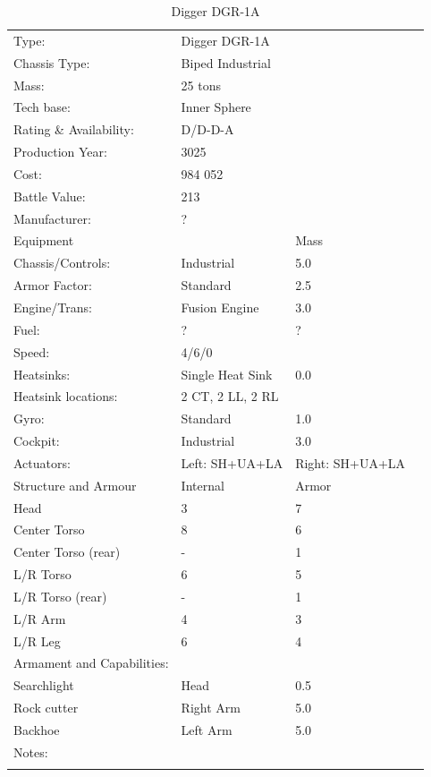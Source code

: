 \documentclass{tufte-book}
\begin{document}
\bigskip
\begin{table}
\begin{minipage}{\textwidth}
\begin{center}
\begin{tabular}{llll}
\toprule
Type: & Digger DGR-1A & \\
Chassis Type: & Biped Industrial & \\
Mass: & 25 tons & \\
Tech base: & Inner Sphere & \\
Rating \& Availability: & D/D-D-A & \\
Production Year: & 3025 & \\
Cost: & 984 052 & \\
Battle Value: & 213 & \\
Manufacturer: & ? & \\
Equipment & & Mass \\
\quad Chassis/Controls: & Industrial & 5.0 \\
\quad Armor Factor: & Standard & 2.5 \\
\quad Engine/Trans: & Fusion Engine & 3.0 \\
\quad Fuel: & ? & ? \\
\quad Speed: & \multicolumn{2}{l}{4/6/0} \\
\quad Heatsinks: & Single Heat Sink & 0.0 \\
\quad Heatsink locations: & 2 CT, 2 LL, 2 RL & \\
\quad Gyro: & Standard & 1.0 \\
\quad Cockpit: & Industrial & 3.0 \\
\quad Actuators: & Left: SH+UA+LA & Right: SH+UA+LA \\
Structure and Armour & Internal & Armor \\
\quad Head & 3 & 7 \\
\quad Center Torso & 8 & 6 \\
\quad Center Torso (rear) & - & 1 \\
\quad L/R Torso & 6 & 5 \\
\quad L/R Torso (rear) & - & 1 \\
\quad L/R Arm & 4 & 3 \\
\quad L/R Leg & 6 & 4 \\

Armament and Capabilities: & & \\
\quad Searchlight & Head & 0.5 \\
\quad Rock cutter & Right Arm & 5.0 \\
\quad Backhoe & Left Arm & 5.0 \\

Notes: & & \\
\multicolumn{3}{l}{\quad } \\

\bottomrule
\end{tabular}
\end{center}
\end{minipage}
\caption{Digger DGR-1A}
\end{table}
\end{document}

